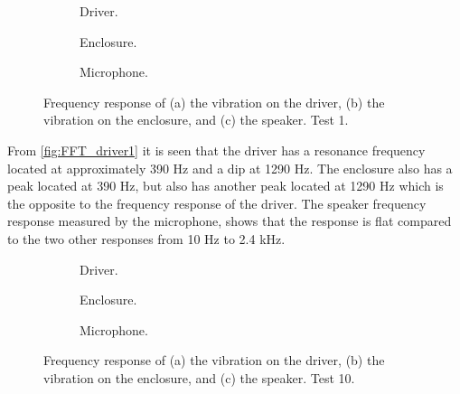\begin{figure}[H]
\centering
\begin{subfigure}[t]{0.37\textwidth}
	
	\caption{Driver.}
	\label{fig:FFT_driver1}
\end{subfigure}
\begin{subfigure}[t]{0.28\textwidth}
	
	\caption{Enclosure.}
	\label{fig:FFT_enclosure1}
\end{subfigure}
\begin{subfigure}[t]{0.32\textwidth}
	
	\caption{Microphone.}
	\label{fig:FFT_mic1}
\end{subfigure}
\caption{Frequency response of (a) the vibration on the driver, (b) the vibration on the enclosure, and (c) the speaker. Test 1.}
\label{fig:FFT1}
\end{figure}

From \autoref{fig:FFT_driver1} it is seen that the driver has a resonance frequency located at approximately 390 Hz and a dip at 1290 Hz. The enclosure also has a peak located at 390 Hz, but also has another peak located at 1290 Hz which is the opposite to the frequency response of the driver. The speaker frequency response measured by the microphone, shows that the response is flat compared to the two other responses from 10 Hz to 2.4 kHz.

\begin{figure}[H]
\centering
\begin{subfigure}[t]{0.37\textwidth}
	
	\caption{Driver.}
	\label{fig:FFT_driver10}
\end{subfigure}
\begin{subfigure}[t]{0.28\textwidth}
	
	\caption{Enclosure.}
	\label{fig:FFT_enclosure10}
\end{subfigure}
\begin{subfigure}[t]{0.32\textwidth}
	
	\caption{Microphone.}
	\label{fig:FFT_mic10}
\end{subfigure}
\caption{Frequency response of (a) the vibration on the driver, (b) the vibration on the enclosure, and (c) the speaker. Test 10.}
\label{fig:FFT10}
\end{figure}

